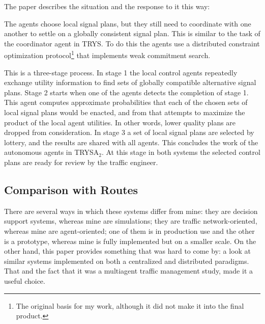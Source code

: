 \documentclass[11pt,letterpaper,onecolumn,twoside,openright,draft]{report}
\begin{document}
The paper describes the situation and the response to it this way:


The agents choose local signal plans, but they still need to coordinate with one another to settle on a globally consistent signal plan.
This is similar to the task of the coordinator agent in TRYS.
To do this the agents use a distributed constraint optimization protocol\footnote{The original basis for my work, although it did not make it into the final product.} that implements weak commitment search\cite{yokoo1999}.

This is a three-stage process.
In stage 1 the local control agents repeatedly exchange utility information to find sets of globally compatible alternative signal plans.
Stage 2 starts when one of the agents detects the completion of stage 1.
This agent computes approximate probabilities that each of the chosen sets of local signal plans would be enacted, and from that attempts to maximize the product of the local agent utilities.
In other words, lower quality plans are dropped from consideration.
In stage 3 a set of local signal plans are selected by lottery, and the results are shared with all agents.
This concludes the work of the autonomous agents in TRYSA$_{2}$.
At this stage in both systems the selected control plans are ready for review by the traffic engineer.

\subsection{Comparison with Routes}
There are several ways in which these systems differ from mine: they are decision support systems, whereas mine are simulations; they are traffic network-oriented, whereas mine are agent-oriented; one of them is in production use and the other is a prototype, whereas mine is fully implemented but on a smaller scale.
On the other hand, this paper provides something that was hard to come by: a look at similar systems implemented on both a centralized and distributed paradigms.
That and the fact that it was a multiagent traffic management study, made it a useful choice.
\end{document}
